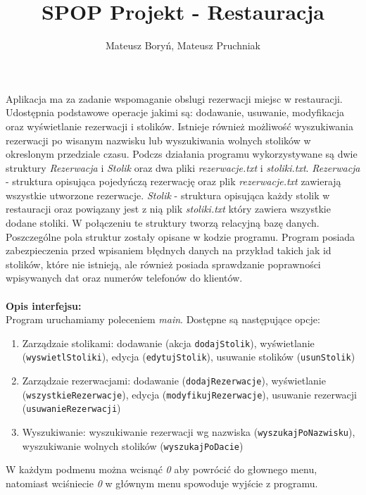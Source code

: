 \documentclass[12pt,a4paper]{article}
\author{Mateusz Boryń, Mateusz Pruchniak}
\title{SPOP Projekt - Restauracja}
\begin{document}
\maketitle
\thispagestyle{empty}
\pagestyle{empty}

Aplikacja ma za zadanie wspomaganie obslugi rezerwacji miejsc w restauracji. Udostępnia podstawowe operacje jakimi są: dodawanie, usuwanie, modyfikacja oraz wyświetlanie rezerwacji i stolików. Istnieje również możliwość wyszukiwania rezerwacji po wisanym nazwisku lub wyszukiwania wolnych stolików w okreslonym przedziale czasu. Podczs działania programu wykorzystywane są dwie struktury \textit{Rezerwacja} i \textit{Stolik} oraz dwa pliki \textit{rezerwacje.txt}  i \textit{stoliki.txt}. \textit{Rezerwacja} - struktura opisująca pojedyńczą rezerwację oraz plik \textit{rezerwacje.txt} zawierają wszystkie utworzone rezerwacje. \textit{Stolik} - struktura opisująca każdy stolik w restauracji oraz powiązany jest z nią plik \textit{stoliki.txt} który zawiera wszystkie dodane stoliki. W połączeniu te struktury tworzą relacyjną bazę danych. Poszczególne pola struktur zostały opisane w kodzie programu. Program posiada zabezpieczenia przed wpisaniem błędnych danych na przykład takich jak id stolików, które nie istnieją, ale również posiada sprawdzanie poprawności wpisywanych dat oraz numerów telefonów do klientów. 
\\\\
{\bf Opis interfejsu:} \\
Program uruchamiamy poleceniem \textit{main}. Dostępne są następujące opcje:

\begin{enumerate}
\item Zarządzaie stolikami: dodawanie (akcja \texttt{dodajStolik}), wyświetlanie (\texttt{wyswietlStoliki}), edycja (\texttt{edytujStolik}), usuwanie stolików (\texttt{usunStolik})
\item Zarządzaie rezerwacjami: dodawanie (\texttt{dodajRezerwacje}), wyświetlanie (\texttt{wszystkieRezerwacje}), edycja (\texttt{modyfikujRezerwacje}), usuwanie rezerwacji (\texttt{usuwanieRezerwacji})
\item Wyszukiwanie: wyszukiwanie rezerwacji wg nazwiska (\texttt{wyszukajPoNazwisku}), wyszukiwanie wolnych stolików (\texttt{wyszukajPoDacie})
\end{enumerate} 


W każdym podmenu można wcisnąć \textit{0} aby powrócić do głownego menu, natomiast wciśniecie \textit{0} w głównym menu spowoduje wyjście z programu.
\\
\end{document}
